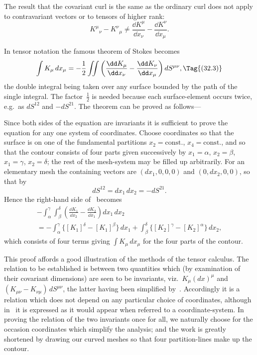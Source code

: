 \documentclass[12pt]{book}
\begin{document}
The result that the covariant curl is the same as the ordinary curl does
not apply to contravariant vectors or to tensors of higher rank:
\[
{K^{\mu}}_{\nu} - {K^{\nu}}_{\mu} \neq \frac{\dd K^{\mu}}{\dd x_{\nu}} - \frac{\dd K^{\nu}}{\dd x_{\mu}}.
\]

In tensor notation the famous theorem of Stokes becomes
%
\[
\int K_{\mu}\, dx_{\mu} = -\frac{1}{2} \iint \left(\frac{\dd K_{\mu}}{\dd x_{\nu}} - \frac{\dd K_{\nu}}{\dd x_{\mu}}\right) dS^{\mu\nu},
\Tag{(32.3)}
\]
the double integral being taken over any surface bounded by the path of the
single integral. The factor~$\frac{1}{2}$ is needed because each surface-element occurs
twice, e.g.\ as $dS^{12}$ and $-dS^{21}$. The theorem can be proved as follows---

Since both sides of the equation are invariants it is sufficient to prove the
equation for any one system of coordinates. Choose coordinates so that the
surface is on one of the fundamental partitions $x_{2} = \text{const.}$, $x_{4} = \text{const.}$, and so
that the contour consists of four parts given successively by $x_{1} = \alpha$, $x_{2} = \beta$,
$x_{1} = \gamma$, $x_{2} = \delta$; the rest of the mesh-system may be filled up arbitrarily. For
an elementary mesh the containing vectors are $(dx_{1}, 0, 0, 0)$ and $(0, dx_{2} , 0, 0)$,
so that by~
\[
dS^{12} = dx_{1}\, dx_{2} = -dS^{21}.
\]
Hence the right-hand side of~ becomes
\begin{multline*}
  -\int_{\alpha}^{\gamma} \int_{\beta}^{\delta} \left(\frac{\dd K_{1}}{\dd x_{2}} - \frac{\dd K_{2}}{\dd x_{1}}\right) dx_{1}\, dx_{2} \\
  = -\int_{\alpha}^{\gamma} \bigl\{[K_{1}]^{\delta} - [K_{1}]^{\beta}\bigr\}\, dx_{1}
   + \int_{\beta}^{\delta} \bigl\{[K_{2}]^{\gamma} - [K_{2}]^{\alpha}\bigr\}\, dx_{2},
\end{multline*}
which consists of four terms giving $\int K_{\mu}\, dx_{\mu}$ for the four parts of the contour.

This proof affords a good illustration of the methods of the tensor calculus.
The relation to be established is between two quantities which (by examination
of their covariant dimensions) are seen to be invariants, viz.\ $K_{\mu} (dx)^{\mu}$ and
%
%
$(K_{\mu\nu} - K_{\nu\mu})\, dS^{\mu\nu}$, the latter having been simplified by~. Accordingly it
is a relation which does not depend on any particular choice of coordinates,
although in~ it is expressed as it would appear when referred to a
coordinate-system. In proving the relation of the two invariants once for all,
we naturally choose for the occasion coordinates which simplify the analysis;
and the work is greatly shortened by drawing our curved meshes so that four
partition-lines make up the contour.
\end{document}
